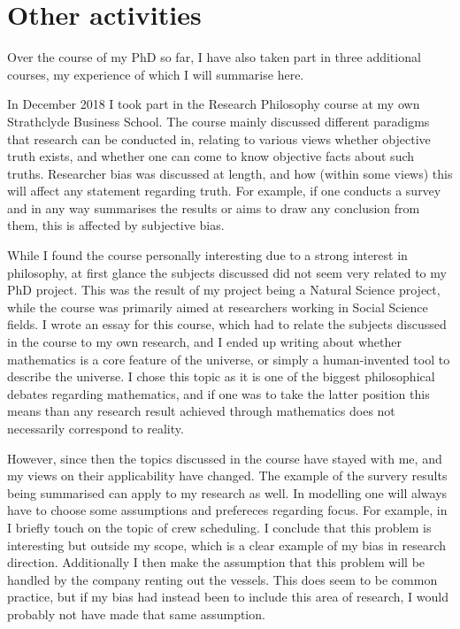 \documentclass[a4paper,12pt]{article}
\begin{document}
\pagebreak

\section{Other activities} \label{s:otact}
Over the course of my PhD so far, I have also taken part in three additional courses, my experience of which I will summarise here. 

\bigskip

In December 2018 I took part in the Research Philosophy course at my own Strathclyde Business School. The course mainly discussed different paradigms that research can be conducted in, relating to various views whether objective truth exists, and whether one can come to know objective facts about such truths. Researcher bias was discussed at length, and how (within some views) this will affect any statement regarding truth. For example, if one conducts a survey and in any way summarises the results or aims to draw any conclusion from them, this is affected by subjective bias. 

While I found the course personally interesting due to a strong interest in philosophy, at first glance the subjects discussed did not seem very related to my PhD project. This was the result of my project being a Natural Science project, while the course was primarily aimed at researchers working in Social Science fields. I wrote an essay for this course, which had to relate the subjects discussed in the course to my own research, and I ended up writing about whether mathematics is a core feature of the universe, or simply a human-invented tool to describe the universe. I chose this topic as it is one of the biggest philosophical debates regarding mathematics, and if one was to take the latter position this means than any research result achieved through mathematics does not necessarily correspond to reality. 

However, since then the topics discussed in the course have stayed with me, and my views on their applicability have changed. The example of the survery results being summarised can apply to my research as well. In modelling one will always have to choose some assumptions and prefereces regarding focus. For example, in  I briefly touch on the topic of crew scheduling. I conclude that this problem is interesting but outside my scope, which is a clear example of my bias in research direction. Additionally I then make the assumption that this problem will be handled by the company renting out the vessels. This does seem to be common practice, but if my bias had instead been to include this area of research, I would probably not have made that same assumption. 
\end{document}
